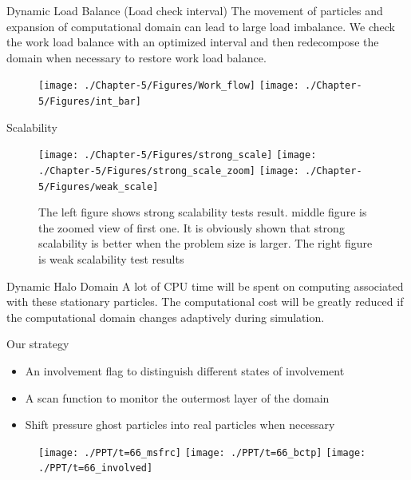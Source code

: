 \documentclass{beamer}
\begin{document}
\begin{frame}{Dynamic Load Balance (Load check interval)}
The movement of particles and expansion of computational domain can lead to large load imbalance. We check the work load balance with an optimized interval and then redecompose the domain when necessary to restore work load balance.
\begin{figure}
\flushleft
\texttt{[image: ./Chapter-5/Figures/Work\_flow]}
\hfill
\texttt{[image: ./Chapter-5/Figures/int\_bar]}
\end{figure}
\end{frame}

\begin{frame}{Scalability}
\begin{figure}
\flushleft
\texttt{[image: ./Chapter-5/Figures/strong\_scale]}
\hfill
\texttt{[image: ./Chapter-5/Figures/strong\_scale\_zoom]}
\hfill
\texttt{[image: ./Chapter-5/Figures/weak\_scale]}
\caption{The left figure shows strong scalability tests result. middle figure is the zoomed view of first one. It is obviously shown that strong scalability is better when the problem size is larger. The right figure is weak scalability test results}
\label{fig:2cases_efficiency}
\end{figure}
%
\end{frame}

\begin{frame}{Dynamic Halo Domain}
A lot of CPU time will be spent
on computing associated with these stationary particles. The computational cost will be greatly reduced if the computational domain changes adaptively during simulation. 
\begin{block}{Our strategy}
  \begin{itemize}
  \item {
    An involvement flag to distinguish different states of involvement
  }
  \item {
    A scan function to monitor the outermost layer of the domain
  }
  \item {
    Shift pressure ghost particles into real particles when necessary
  }
  \end{itemize}
\end{block}
%
\begin{figure}
\flushleft
\texttt{[image: ./PPT/t=66\_msfrc]}
\hfill
\texttt{[image: ./PPT/t=66\_bctp]}
\hfill
\texttt{[image: ./PPT/t=66\_involved]}
\end{figure}
\end{frame}
\end{document}
